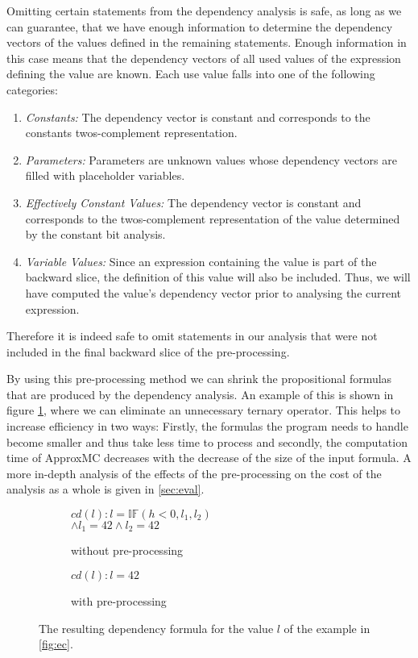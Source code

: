 Omitting certain statements from the dependency analysis is safe, as long as we can guarantee, that we have enough information to determine the dependency vectors of the values defined in the remaining statements. Enough information in this case means that the dependency vectors of all used values of the expression defining the value are known. Each use value falls into one of the following categories:
\begin{enumerate}
    \item \emph{Constants: }The dependency vector is constant and corresponds to the constants twos-complement representation.
    \item \emph{Parameters: }Parameters are unknown values whose dependency vectors are filled with placeholder variables.
    \item \emph{Effectively Constant Values: }The dependency vector is constant and corresponds to the twos-complement representation of the value determined by the constant bit analysis.
    \item \emph{Variable Values: }Since an expression containing the value is part of the backward slice, the definition of this value will also be included. Thus, we will have computed the value's dependency vector prior to analysing the current expression.
\end{enumerate}
Therefore it is indeed safe to omit statements in our analysis that were not included in the final backward slice of the pre-processing.

By using this pre-processing method we can shrink the propositional formulas that are produced by the dependency analysis. An example of this is shown in figure \ref{fig:ppRes}, where we can eliminate an unnecessary ternary operator. This helps to increase efficiency in two ways: Firstly, the formulas the program needs to handle become smaller and thus take less time to process and secondly, the computation time of ApproxMC decreases with the decrease of the size of the input formula. A more in-depth analysis of the effects of the pre-processing on the cost of the analysis as a whole is given in \ref{sec:eval}. 

\begin{figure}
    \begin{subfigure}[t]{.4\textwidth}
        \centering
        $cd(l) : l = \mathbb{IF}(h < 0, l_1, l_2)$ \\ $\land l_1 = 42 \land l_2 = 42$
        \caption{without pre-processing}
    \end{subfigure}
    \begin{subfigure}[t]{.4\textwidth}
        \centering
        $cd(l) : l = 42$
        \vspace{\baselineskip}
        \caption{with pre-processing}
    \end{subfigure}
    \caption{The resulting dependency formula for the value $l$ of the example in \ref{fig:ec}. }
    \label{fig:ppRes}
\end{figure}

